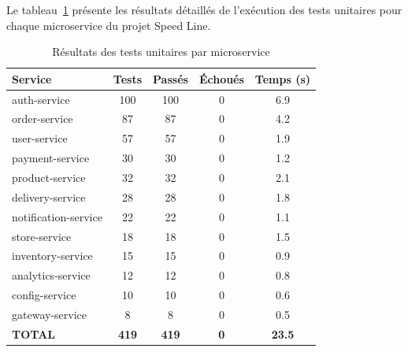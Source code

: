 Le tableau~\ref{tab:resultats-unitaires} pr\'{e}sente les r\'{e}sultats
d\'{e}taill\'{e}s de l'ex\'{e}cution des tests unitaires pour chaque microservice
du projet Speed Line.

\begin{table}[H]
\centering
\caption{R\'{e}sultats des tests unitaires par microservice}
\label{tab:resultats-unitaires}
\begin{tabularx}{\textwidth}{|X|c|c|c|c|}
\hline
\rowcolor{speedlineBlue!10}
\textbf{Service} & \textbf{Tests} & \textbf{Pass\'{e}s} & \textbf{\'{E}chou\'{e}s} & \textbf{Temps (s)} \\
\hline
auth-service & 100 & \textcolor{speedlineGreen}{100} & \textcolor{speedlineGreen}{0} & 6.9 \\
\hline
order-service & 87 & \textcolor{speedlineGreen}{87} & \textcolor{speedlineGreen}{0} & 4.2 \\
\hline
user-service & 57 & \textcolor{speedlineGreen}{57} & \textcolor{speedlineGreen}{0} & 1.9 \\
\hline
payment-service & 30 & \textcolor{speedlineGreen}{30} & \textcolor{speedlineGreen}{0} & 1.2 \\
\hline
product-service & 32 & \textcolor{speedlineGreen}{32} & \textcolor{speedlineGreen}{0} & 2.1 \\
\hline
delivery-service & 28 & \textcolor{speedlineGreen}{28} & \textcolor{speedlineGreen}{0} & 1.8 \\
\hline
notification-service & 22 & \textcolor{speedlineGreen}{22} & \textcolor{speedlineGreen}{0} & 1.1 \\
\hline
store-service & 18 & \textcolor{speedlineGreen}{18} & \textcolor{speedlineGreen}{0} & 1.5 \\
\hline
inventory-service & 15 & \textcolor{speedlineGreen}{15} & \textcolor{speedlineGreen}{0} & 0.9 \\
\hline
analytics-service & 12 & \textcolor{speedlineGreen}{12} & \textcolor{speedlineGreen}{0} & 0.8 \\
\hline
config-service & 10 & \textcolor{speedlineGreen}{10} & \textcolor{speedlineGreen}{0} & 0.6 \\
\hline
gateway-service & 8 & \textcolor{speedlineGreen}{8} & \textcolor{speedlineGreen}{0} & 0.5 \\
\hline
\rowcolor{speedlineGreen!10}
\textbf{TOTAL} & \textbf{419} & \textbf{419} & \textbf{0} & \textbf{23.5} \\
\hline
\end{tabularx}
\end{table}

